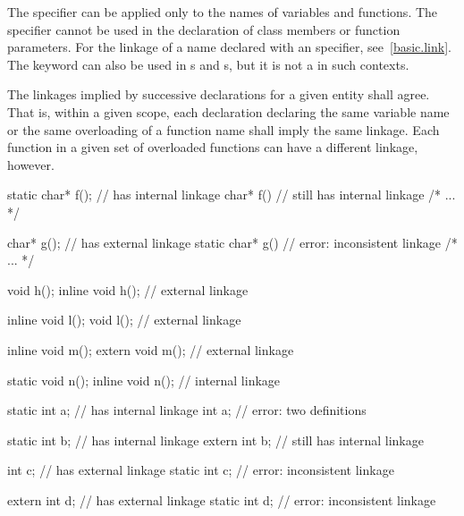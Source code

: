 \pnum
{}%
The  specifier can be applied only to the names of variables
and functions. The  specifier cannot be used in the
declaration of class members or function parameters.
%
%
For the linkage of a name declared with an  specifier,
see~\ref{basic.link}.
\enternote
The  keyword can also be used in
s and
s, but it is not a
 in such contexts.
\exitnote

\pnum
The linkages implied by successive declarations for a given entity shall
agree. That is, within a given scope, each declaration declaring the
same variable name or the same overloading of a function name shall imply
the same linkage. Each function in a given set of overloaded functions
can have a different linkage, however.
\enterexample
{}%

\begin{codeblock}
static char* f();               //  has internal linkage
char* f()                       //  still has internal linkage
  { /* ... */ }

char* g();                      //  has external linkage
static char* g()                // error: inconsistent linkage
  { /* ... */ }

void h();
inline void h();                // external linkage

inline void l();
void l();                       // external linkage

inline void m();
extern void m();                // external linkage

static void n();
inline void n();                // internal linkage

static int a;                   //  has internal linkage
int a;                          // error: two definitions

static int b;                   //  has internal linkage
extern int b;                   //  still has internal linkage

int c;                          //  has external linkage
static int c;                   // error: inconsistent linkage

extern int d;                   //  has external linkage
static int d;                   // error: inconsistent linkage
\end{codeblock}
\exitexample

